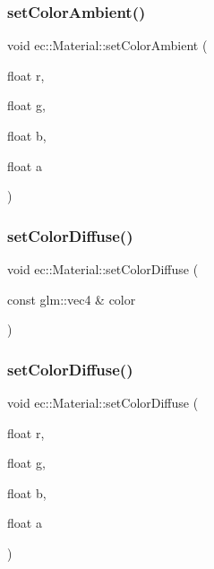 \subsubsection{\texorpdfstring{set\+Color\+Ambient()}{setColorAmbient()}\hspace{0.1cm}{\footnotesize\ttfamily [2/2]}}
{\footnotesize\ttfamily void ec\+::\+Material\+::set\+Color\+Ambient (\begin{DoxyParamCaption}\item[{float}]{r,  }\item[{float}]{g,  }\item[{float}]{b,  }\item[{float}]{a }\end{DoxyParamCaption})}

\mbox{\label{classec_1_1_material_a22b711323a849e2ff6f9ffb871402a3e}} 
\subsubsection{\texorpdfstring{set\+Color\+Diffuse()}{setColorDiffuse()}\hspace{0.1cm}{\footnotesize\ttfamily [1/2]}}
{\footnotesize\ttfamily void ec\+::\+Material\+::set\+Color\+Diffuse (\begin{DoxyParamCaption}\item[{const glm\+::vec4 \&}]{color }\end{DoxyParamCaption})}

\mbox{\label{classec_1_1_material_aa86e76b930ffffd45076465eff08bf27}} 
\subsubsection{\texorpdfstring{set\+Color\+Diffuse()}{setColorDiffuse()}\hspace{0.1cm}{\footnotesize\ttfamily [2/2]}}
{\footnotesize\ttfamily void ec\+::\+Material\+::set\+Color\+Diffuse (\begin{DoxyParamCaption}\item[{float}]{r,  }\item[{float}]{g,  }\item[{float}]{b,  }\item[{float}]{a }\end{DoxyParamCaption})}

